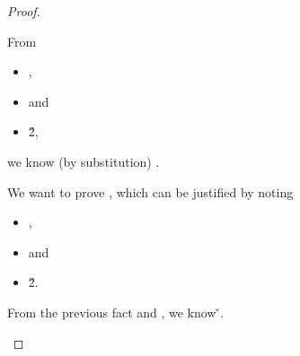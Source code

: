 \begin{lemma}
\begin{proof}
\begin{case}[B-BetaClosure]
\begin{itemize}
\begin{subcase}[T-App]
          From 
          \begin{itemize}
            \item
              ,
            \item
  \judgementrewrite {\propenv{}}
                 {} {\s{}}
                 {
                             {}}
                 {}
                 {} and 
            \item
  \opsem {\openv{}}
         {}
         {\v{2}},
     \end{itemize}
              we know (by substitution)
              .

              We want to prove
        \judgementrewrite {\propenvc{}}
                          {}
                          {}
               {}
                          {}
                          {}, 
                          which can be justified by noting 
          \begin{itemize}
            \item
  ,
            \item
  \judgementrewrite {\propenv{}}
                 {} {\s{}}
                 {
                             {}}
                 {}
                 {} and 
            \item
  \opsem {\openv{}}
         {}
         {\v{2}}.
     \end{itemize}

     From the previous fact and ,
              we know
         {}
         {\v{}}.


\end{subcase}
\end{itemize}
\end{case}
\end{proof}
\end{lemma}
